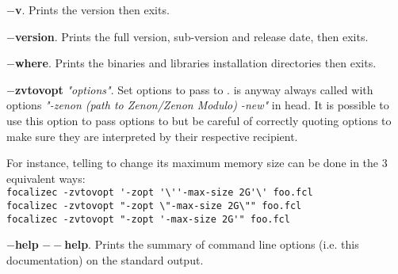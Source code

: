 \begin{compact-itemize}
  \item[*] {\bf $-$v}. Prints the {\focal} version then exits.

  \item[*] {\bf $-$version}. Prints the full {\focal} version,
    sub-version and release date, then exits.

  \item[*] {\bf $-$where}. Prints the binaries and libraries
    installation directories then exits.

  \item[*] {\bf $-$zvtovopt} {\em "options"}. Set options to pass to {\zvtov}.
    {\zvtov} is anyway always called with options
    {\em "-zenon (path to Zenon/Zenon Modulo) -new"} in head. It is possible to use this
    option to pass options to {\zenon} but be careful of correctly quoting
    options to make sure they are interpreted by their respective recipient.

    For instance, telling {\zenon} to change its maximum memory size can be
    done in the 3 equivalent ways:\\
    \verb+focalizec -zvtovopt '-zopt '\''-max-size 2G'\' foo.fcl+\\
    \verb+focalizec -zvtovopt "-zopt \"-max-size 2G\"" foo.fcl+\\
    \verb+focalizec -zvtovopt "-zopt '-max-size 2G'" foo.fcl+

  \item[*] {\bf $-$help} {\bf $--$help}. Prints the summary of command
    line options (i.e. this documentation) on the standard output.
\end{compact-itemize}
